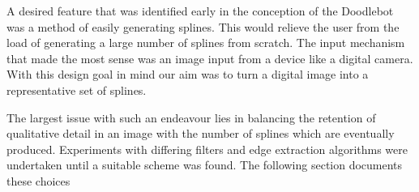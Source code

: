 A desired feature that was identified early in the conception of the Doodlebot was a method of easily generating splines. This would relieve the user from the load of generating a large number of splines from scratch. The input mechanism that made the most sense was an image input from a device like a digital camera. With this design goal in mind our aim was to turn a digital image into a representative set of splines.

The largest issue with such an endeavour lies in balancing the retention of qualitative detail in an image with the number of splines which are eventually produced. Experiments with differing filters and edge extraction algorithms were undertaken until a suitable scheme was found. The following section documents these choices